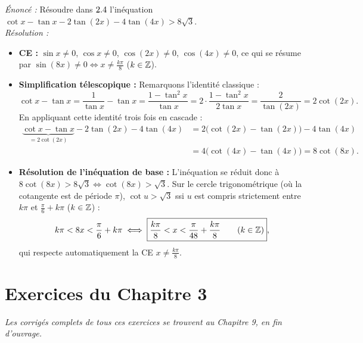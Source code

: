 \begin{exemple}
\emph{Énoncé :} Résoudre dans $2.4$ l'inéquation $\cot x - \tan x - 2\tan(2x) - 4\tan(4x) > 8\sqrt{3}$.\\
\emph{Résolution :}
\begin{itemize}
    \item \textbf{CE :} $\sin x \neq 0$, $\cos x \neq 0$, $\cos(2x) \neq 0$, $\cos(4x) \neq 0$, ce qui se résume par $\sin(8x) \neq 0 \iff x \neq \frac{k\pi}{8}$ ($k\in\mathbb{Z}$).
    \item \textbf{Simplification télescopique :} Remarquons l'identité classique :
    \[
        \cot x - \tan x = \frac{1}{\tan x} - \tan x = \frac{1 - \tan^2 x}{\tan x} = 2\cdot\frac{1 - \tan^2 x}{2\tan x} = \frac{2}{\tan(2x)} = 2\cot(2x).
    \]
    En appliquant cette identité trois fois en cascade :
    \begin{align*}
        \underbrace{\cot x - \tan x}_{=2\cot(2x)} - 2\tan(2x) - 4\tan(4x) &= 2\bigl(\cot(2x) - \tan(2x)\bigr) - 4\tan(4x) \\
        &= 4\bigl(\cot(4x) - \tan(4x)\bigr) = 8\cot(8x).
    \end{align*}
    \item \textbf{Résolution de l'inéquation de base :} L'inéquation se réduit donc à $8\cot(8x) > 8\sqrt{3} \iff \cot(8x) > \sqrt{3}$. Sur le cercle trigonométrique (où la cotangente est de période $\pi$), $\cot u > \sqrt{3}$ ssi $u$ est compris strictement entre $k\pi$ et $\frac{\pi}{6} + k\pi$ ($k \in \mathbb{Z}$) :
    \[
        k\pi < 8x < \frac{\pi}{6} + k\pi \iff \boxed{\frac{k\pi}{8} < x < \frac{\pi}{48} + \frac{k\pi}{8} \qquad (k \in \mathbb{Z})},
    \]
    qui respecte automatiquement la CE $x \neq \frac{k\pi}{8}$.
\end{itemize}
\end{exemple}

\section{Exercices du Chapitre 3}

\emph{Les corrigés complets de tous ces exercices se trouvent au Chapitre 9, en fin d'ouvrage.}

